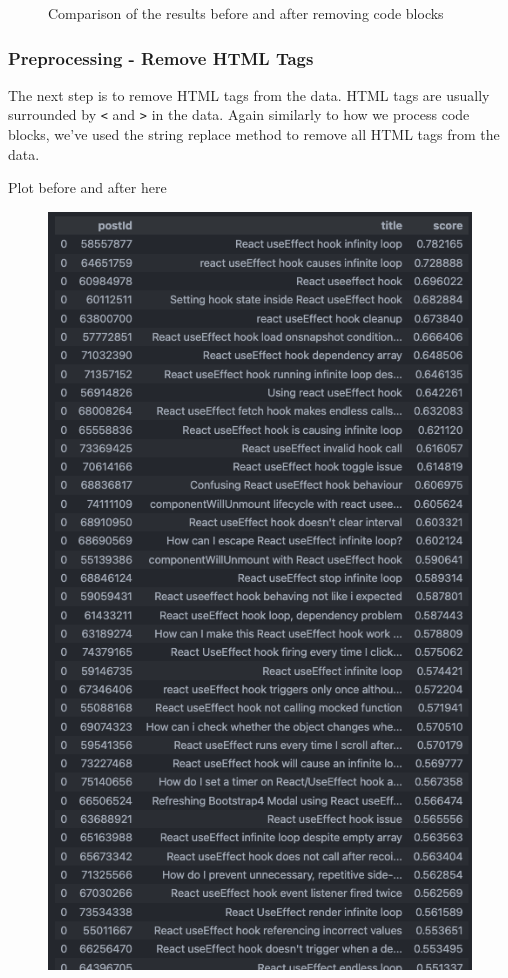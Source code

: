 \begin{figure}[H]
\caption{Comparison of the results before and after removing code blocks }\label{code_block_comparison}
\end{figure}

\subsubsection{Preprocessing - Remove HTML Tags}
The next step is to remove HTML tags from the data. HTML tags are usually surrounded by \texttt{<} and \texttt{>} in the data. Again similarly to how we process code blocks, we've used the string replace method to remove all HTML tags from the data.

Plot before and after here
\begin{figure}[H]
  \noindent \includegraphics[scale=0.45]{assets/spacy-query-1-results.png}

\end{figure}
